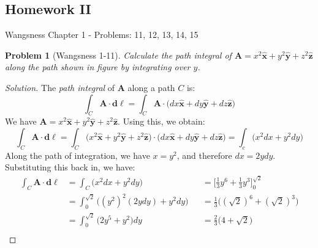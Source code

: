 \documentclass[oneside]{book}
\theoremstyle{mystyle}
\newtheorem{problem}{Problem}[section]
\begin{document}
\subsection{Homework II}
Wangsness Chapter 1 - Problems: 11, 12, 13, 14, 15
\begin{problem}[Wangsness 1-11]
\label{problem:EMAG_1_Wangsness_1_11}
Calculate the path integral of $\mathbf{A}=x^2\hat{\mathbf{x}}+y^2\hat{\mathbf{y}}+z^2\hat{\mathbf{z}}$ along the path shown in figure  by integrating over $y$.
\end{problem}
\begin{proof}[Solution]
The \textit{path integral} of $\mathbf{A}$ along a path $C$ is:
\begin{equation*}
    \int_{C}\mathbf{A}\cdot\boldsymbol{d\ell}=\int_{C}\mathbf{A}\cdot\big(dx\hat{\mathbf{x}}+dy\hat{\mathbf{y}}+dz\hat{\mathbf{z}}\big)
\end{equation*}
We have $\mathbf{A}=x^{2}\hat{\mathbf{x}}+y^{2}\hat{\mathbf{y}}+z^{2}\hat{\mathbf{z}}$. Using this, we obtain:
\begin{equation*}
    \int_{C}\mathbf{A}\cdot\boldsymbol{d\ell}=\int_{C}\big(x^{2}\hat{\mathbf{x}}+y^{2}\hat{\mathbf{y}}+z^{2}\hat{\mathbf{z}}\big)\cdot\big(dx\hat{\mathbf{x}}+dy\hat{\mathbf{y}}+dz\hat{\mathbf{z}}\big)=\int_{c}\big(x^2dx+y^2dy\big)
\end{equation*}
Along the path of integration, we have $x=y^2$, and therefore $dx = 2ydy$. Substituting this back in, we have:
\begin{align*}
    \int_{C}\mathbf{A}\cdot\boldsymbol{d\ell}&=\int_{C}\big(x^{2}dx+y^{2}dy\big)& &=\bigg[\frac{1}{3}y^{6}+\frac{1}{3}y^{3}\bigg]_{0}^{\sqrt{2}}\\
    &=\int_{0}^{\sqrt{2}}\big((y^{2})^{2}(2ydy) + y^{2}dy\big) & &=\frac{1}{3}\big((\sqrt{2})^{6}+(\sqrt{2})^{3}\big)\\
    &=\int_{0}^{\sqrt{2}}\big(2y^{5}+y^{2}\big)dy& &=\frac{2}{3}\big(4+\sqrt{2}\big)\\
\end{align*}
\end{proof}
\end{document}
